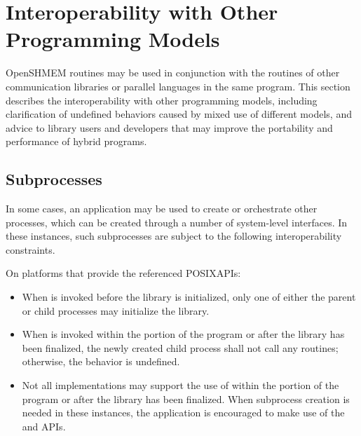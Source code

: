 \chapter{Interoperability with Other Programming Models}\label{sec:interoperability}

OpenSHMEM routines may be used in conjunction with the routines of other
communication libraries or parallel languages in the same program. This section
describes the interoperability with other programming models, including
clarification of undefined behaviors caused by mixed use of different models,
and advice to \openshmem library users and developers that may improve the portability
and performance of hybrid programs.

\section{Subprocesses}

In some cases, an \openshmem application may be used to create or
orchestrate other processes, which can be created through a number of
system-level interfaces.  In these instances, such subprocesses are
subject to the following interoperability constraints.

On platforms that provide the referenced POSIX\footnotemark[1] \acp{API}:


\begin{itemize}
\item When  is invoked before the \openshmem library is
  initialized, only one of either the parent or child processes may
  initialize the \openshmem library.
\item When  is invoked within the \openshmem portion of the
  program or after the \openshmem library has been finalized, the
  newly created child process shall not call any \openshmem routines;
  otherwise, the behavior is undefined.
\item Not all \openshmem implementations may support the use of
   within the \openshmem portion of the program or after
  the \openshmem library has been finalized.
  When subprocess creation is needed in these instances, the
  application is encouraged to make use of the  and
   \acp{API}.
\end{itemize}

